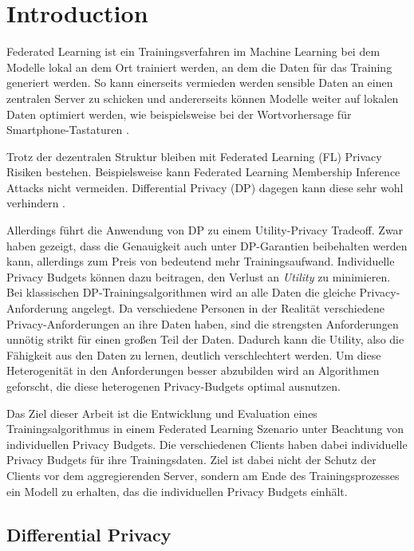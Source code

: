 \chapter{Introduction}

Federated Learning ist ein Trainingsverfahren im Machine Learning bei dem Modelle lokal an dem Ort trainiert werden, an dem die Daten für das Training generiert werden. So kann einerseits vermieden werden sensible Daten an einen zentralen Server zu schicken und andererseits können Modelle weiter auf lokalen Daten optimiert werden, wie beispielsweise bei der Wortvorhersage für Smartphone-Tastaturen \parencite{mcmahan:2018}. 

Trotz der dezentralen Struktur bleiben mit Federated Learning (FL) Privacy Risiken bestehen. Beispielsweise kann Federated Learning Membership Inference Attacks nicht vermeiden. Differential Privacy (DP) dagegen kann diese sehr wohl verhindern \parencite{shokri:2017}. 

Allerdings führt die Anwendung von DP zu einem Utility-Privacy Tradeoff. Zwar haben \textcite{mcmahan:2018} gezeigt, dass die Genauigkeit auch unter DP-Garantien beibehalten werden kann, allerdings zum Preis von bedeutend mehr Trainingsaufwand. Individuelle Privacy Budgets können dazu beitragen, den Verlust an \textit{Utility} zu minimieren. Bei klassischen DP-Trainingsalgorithmen wird an alle Daten die gleiche Privacy-Anforderung angelegt. Da verschiedene Personen in der Realität verschiedene Privacy-Anforderungen an ihre Daten haben, sind die strengsten Anforderungen unnötig strikt für einen großen Teil der Daten. Dadurch kann die Utility, also die Fähigkeit aus den Daten zu lernen, deutlich verschlechtert werden. Um diese Heterogenität in den Anforderungen besser abzubilden wird an Algorithmen geforscht, die diese heterogenen Privacy-Budgets optimal ausnutzen.

Das Ziel dieser Arbeit ist die Entwicklung und Evaluation eines Trainingsalgorithmus in einem Federated Learning Szenario unter Beachtung von individuellen Privacy Budgets. Die verschiedenen Clients haben dabei individuelle Privacy Budgets für ihre Trainingsdaten. Ziel ist dabei nicht der Schutz der Clients vor dem aggregierenden Server, sondern am Ende des Trainingsprozesses ein Modell zu erhalten, das die individuellen Privacy Budgets einhält.

\section{Differential Privacy}

